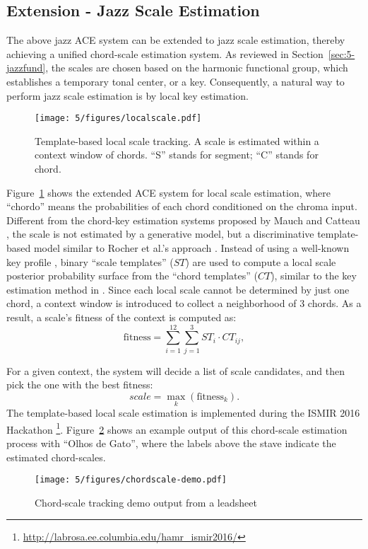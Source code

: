 \subsection{Extension - Jazz Scale Estimation}
The above jazz ACE system can be extended to jazz scale estimation, thereby achieving a unified chord-scale estimation system. As reviewed in Section~\ref{sec:5-jazzfund}, the scales are chosen based on the harmonic functional group, which establishes a temporary tonal center, or a key. Consequently, a natural way to perform jazz scale estimation is by local key estimation.
\begin{figure}[htb]
    \centering
        \texttt{[image: 5/figures/localscale.pdf]}
    \caption{Template-based local scale tracking. A scale is estimated within a context window of chords. ``S'' stands for segment; ``C'' stands for chord.}
    \label{fig:5-localscale}
\end{figure}
Figure~\ref{fig:5-localscale} shows the extended ACE system for local scale estimation, where ``chordo'' means the probabilities of each chord conditioned on the chroma input. Different from the chord-key estimation systems proposed by Mauch \cite{mauch2010simultaneous} and Catteau \cite{catteau2007probabilistic}, the scale is not estimated by a generative model, but a discriminative template-based model similar to Rocher et al.'s approach \cite{rocher2010concurrent}. Instead of using a well-known key profile \cite{temperley2004cognition}, binary ``scale templates'' ($ST$) are used to compute a local scale posterior probability surface from the ``chord templates'' ($CT$), similar to the key estimation method in \cite{hu2015safedj}. Since each local scale cannot be determined by just one chord, a context window is introduced to collect a neighborhood of 3 chords. As a result, a scale's fitness of the context is computed as:
\begin{equation}
\text{fitness} = \sum_{i=1}^{12} \sum_{j=1}^3 {ST_i\cdot CT_{ij}},
\end{equation}

For a given context, the system will decide a list of scale candidates, and then pick the one with the best fitness:
\begin{equation}
scale = \max_k (\text{fitness}_k).
\end{equation}
The template-based local scale estimation is implemented during the ISMIR 2016 Hackathon \footnote{\url{http://labrosa.ee.columbia.edu/hamr\_ismir2016/}}. Figure~\ref{fig:5-chordscale} shows an example output of this chord-scale estimation process with ``Olhos de Gato'', where the labels above the stave indicate the estimated chord-scales.
\begin{figure}[htbp]
    \centering
        \texttt{[image: 5/figures/chordscale-demo.pdf]}
    \caption{Chord-scale tracking demo output from a leadsheet}
    \label{fig:5-chordscale}
\end{figure}

